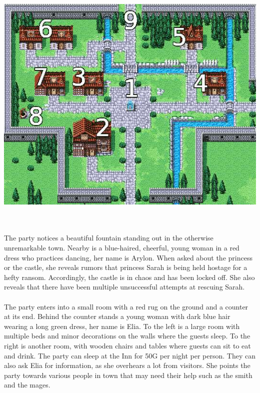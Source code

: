 \begin{center} \includegraphics[width=\columnwidth]{./art/chaosincornelia/cornelia.jpg} \end{center}
%
\clearpage
%
\\\\
%
 The party notices a beautiful fountain standing out in the otherwise unremarkable town.
Nearby is a blue-haired, cheerful, young woman in a red dress who practices dancing, her name is Arylon.
When asked about the princess or the castle, she reveals rumors that princess Sarah is being held hostage for a hefty ransom.
Accordingly, the castle is in chaos and has been locked off.
She also reveals that there have been multiple unsuccessful attempts at rescuing Sarah.
%
\vfill
%
\\\\
%
 The party enters into a small room with a red rug on the ground and a counter at its end.
Behind the counter stands a young woman with dark blue hair wearing a long green dress, her name is Elia.
To the left is a large room with multiple beds and minor decorations on the walls where the guests sleep.
To the right is another room, with wooden chairs and tables where guests can sit to eat and drink.
The party can sleep at the Inn for 50G per night per person.  
They can also ask Elia for information, as she overhears a lot from visitors.
She points the party towards various people in town that may need their help such as the smith and the mages.

